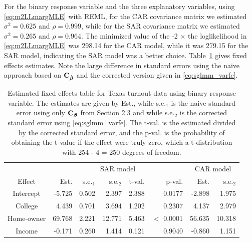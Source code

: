 \documentclass[12pt, titlepage]{article}
\begin{document}
For the binary response variable and the three explanatory variables, using \eqref{eq:m2LLmargMLE} with REML, for the CAR covariance matrix we estimated $\sigma^{2} = 0.625$ and $\rho = 0.999$, while for the SAR covariance matrix we estimated $\sigma^{2} = 0.265$ and $\rho = 0.964$.  The minimized value of the -2 $\times$ the loglikelihood in \eqref{eq:m2LLmargMLE} was 298.14 for the CAR model, while it was 279.15 for the SAR model, indicating the SAR model was a better choice.   Table~\ref{tab:FE_bin} gives fixed effects estimates.  Note the large difference in standard errors using the naive approach based on $\mathbf{C}_{{\hat{\boldsymbol{\beta}}}}$ and the corrected version given in \eqref{eq:sglmm_varfe}.

\begin{table}[H] 
	\caption{Estimated fixed effects table for Texas turnout data using binary response variable.  The estimates are given by Est., while s.e.$_{1}$ is the naive standard error using only $\mathbf{C}_{\boldsymbol{\beta}}$ from Section 2.3 and while s.e.$_{2}$ is the corrected standard error using \eqref{eq:sglmm_varfe}.  The t-val. is the estimated divided by the corrected standard error, and the p-val. is the probability of obtaining the t-value if the effect were truly zero, which a t-distribution with 254 - 4 = 250 degrees of freedom.  \label{tab:FE_bin}}
\begin{center}
\begin{tabular}{|c|rrrrr|rr|}
\hline
\hline{}
{} & \multicolumn{5}{c|}{SAR model} & \multicolumn{2}{c|}{CAR model} \\
Effect & Est. & s.e.$_{1}$ & s.e.$_{2}$ & t-val. & p-val. & Est. & s.e.$_{2}$ \\
\hline{}
Intercept & -5.725 & 0.502 & 2.397 & 2.388 & 0.0177 & -2.898 & 1.975 \\ 
College & 4.439 & 0.701 & 3.694 & 1.202 & 0.2307 & 4.137 & 2.979 \\ 
Home-owner & 69.768 & 2.221 & 12.771 & 5.463 & $<$ 0.0001 & 56.635 & 10.318 \\ 
Income &  -0.171 & 0.260 & 1.414 & 0.121 & 0.9040 & -0.860 & 1.151\\ 
\hline
\hline
\end{tabular}
\end{center}
\end{table}
\end{document}
